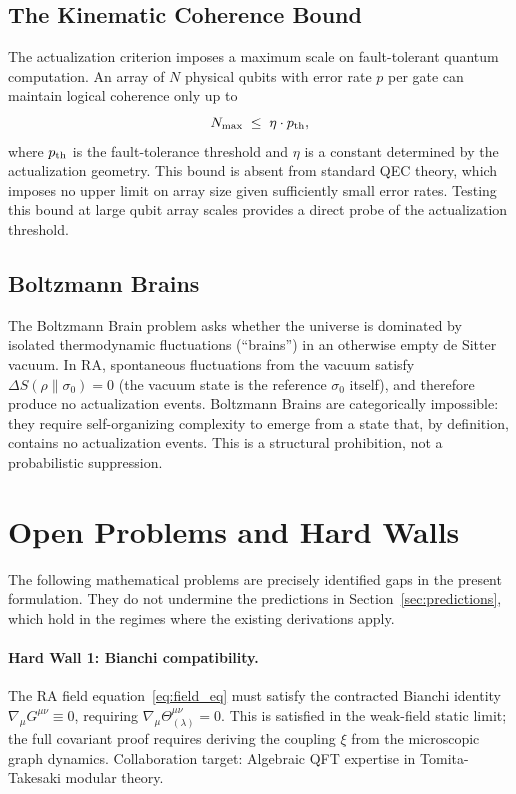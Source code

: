 \documentclass[11pt,twocolumn]{article}
\theoremstyle{plain}
\theoremstyle{remark}
\begin{document}
\subsection{The Kinematic Coherence Bound}

The actualization criterion imposes a maximum scale on fault-tolerant
quantum computation.
An array of $N$ physical qubits with error rate $p$ per gate can
maintain logical coherence only up to
\begin{equation}
  N_{\rm max} \;\leq\; \eta \cdot p_{\rm th},
  \label{eq:KCB}
\end{equation}
where $p_{\rm th}$ is the fault-tolerance threshold and $\eta$
is a constant determined by the actualization geometry.
This bound is absent from standard QEC theory, which imposes no
upper limit on array size given sufficiently small error rates.
Testing this bound at large qubit array scales provides a direct
probe of the actualization threshold.

\subsection{Boltzmann Brains}

The Boltzmann Brain problem asks whether the universe is dominated
by isolated thermodynamic fluctuations (``brains'') in an otherwise
empty de Sitter vacuum.
In RA, spontaneous fluctuations from the vacuum satisfy
$\Delta S(\rho\|\sigma_0) = 0$ (the vacuum state is the reference
$\sigma_0$ itself), and therefore produce no actualization events.
Boltzmann Brains are categorically impossible: they require
self-organizing complexity to emerge from a state that, by definition,
contains no actualization events.
This is a structural prohibition, not a probabilistic suppression.

\section{Open Problems and Hard Walls}
\label{sec:hardwalls}

The following mathematical problems are precisely identified gaps
in the present formulation.
They do not undermine the predictions in Section~\ref{sec:predictions},
which hold in the regimes where the existing derivations apply.

\paragraph{Hard Wall 1: Bianchi compatibility.}
The RA field equation~\eqref{eq:field_eq} must satisfy the contracted
Bianchi identity $\nabla_\mu G^{\mu\nu} \equiv 0$, requiring
$\nabla_\mu\Theta^{\mu\nu}_{(\lambda)} = 0$.
This is satisfied in the weak-field static limit; the full covariant
proof requires deriving the coupling $\xi$ from the microscopic graph
dynamics.
Collaboration target: Algebraic QFT expertise in Tomita-Takesaki
modular theory.
\end{document}
